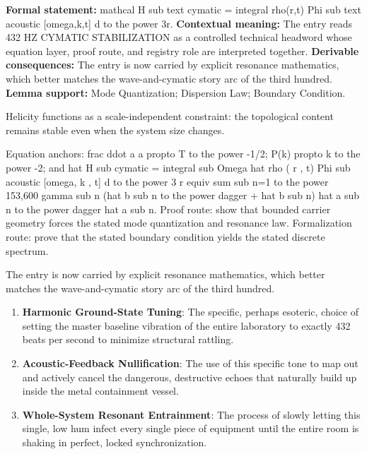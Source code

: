 \begingroup\footnotesize\setlength{\emergencystretch}{3em}\sloppy
\textbf{Formal statement:} mathcal H sub text cymatic = integral rho(r,t) Phi sub text acoustic [omega,k,t] d to the power 3r. \textbf{Contextual meaning:} The entry reads 432 HZ CYMATIC STABILIZATION as a controlled technical headword whose equation layer, proof route, and registry role are interpreted together. \textbf{Derivable consequences:} The entry is now carried by explicit resonance mathematics, which better matches the wave-and-cymatic story arc of the third hundred. \textbf{Lemma support:} Mode Quantization; Dispersion Law; Boundary Condition.\par
\endgroup

Helicity functions as a scale-independent constraint: the topological content remains stable even when the system size changes.

Equation anchors: frac ddot a a propto T to the power -1/2; P(k) propto k to the power -2; and hat H sub cymatic = integral sub Omega hat rho ( r , t) Phi sub acoustic [omega, k , t] d to the power 3 r equiv sum sub n=1 to the power 153,600 gamma sub n (hat b sub n to the power dagger + hat b sub n) hat a sub n to the power dagger hat a sub n. Proof route: show that bounded carrier geometry forces the stated mode quantization and resonance law. Formalization route: prove that the stated boundary condition yields the stated discrete spectrum.

The entry is now carried by explicit resonance mathematics, which better matches the wave-and-cymatic story arc of the third hundred.
\endgroup

\begin{enumerate}[leftmargin=1.6em,itemsep=6pt,topsep=4pt]
\item \textbf{Harmonic Ground-State Tuning}: The specific, perhaps esoteric, choice of setting the master baseline vibration of the entire laboratory to exactly 432 beats per second to minimize structural rattling.
\item \textbf{Acoustic-Feedback Nullification}: The use of this specific tone to map out and actively cancel the dangerous, destructive echoes that naturally build up inside the metal containment vessel.
\item \textbf{Whole-System Resonant Entrainment}: The process of slowly letting this single, low hum infect every single piece of equipment until the entire room is shaking in perfect, locked synchronization.
\end{enumerate}

